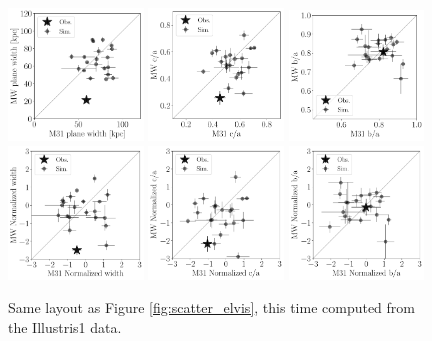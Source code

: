 \documentclass[a4paper,fleqn,usenatbib]{mnras}
\begin{document}
\begin{figure}
\centering
\includegraphics[width=0.32\textwidth]{scatter_ranked_width.pdf}
\includegraphics[width=0.32\textwidth]{scatter_ranked_ca_ratio.pdf}
\includegraphics[width=0.32\textwidth]{scatter_ranked_ba_ratio.pdf}
\includegraphics[width=0.32\textwidth]{scatter_norm_ranked_width.pdf}
\includegraphics[width=0.32\textwidth]{scatter_norm_ranked_ca_ratio.pdf}
\includegraphics[width=0.32\textwidth]{scatter_norm_ranked_ba_ratio.pdf}
\caption{Same layout as Figure \ref{fig:scatter_elvis}, this time
  computed from the Illustris1 data.
\label{fig:scatter_illustris}}
\end{figure}
\end{document}
